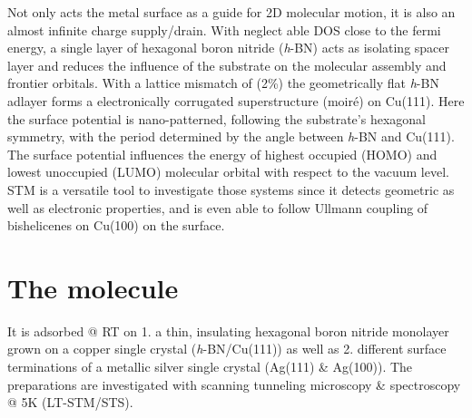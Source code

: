Not only acts the metal surface as a guide for 2D molecular motion, it is also an almost infinite charge supply/drain. With neglect able DOS close to the fermi energy, a single layer of hexagonal boron nitride (\textit{h}-BN) acts as isolating spacer layer and reduces the influence of the substrate on the molecular assembly and frontier orbitals.\cite{urgel_controlling_2015, Sushobhan_Control_2014, Schulz_Templated_2013} With a lattice mismatch of (2\%)\cite{joshi_boron_2012, preobrajenski_monolayer_2005} the geometrically flat\cite{schwarz_corrugation_2017} \textit{h}-BN adlayer forms a electronically corrugated superstructure (moir\'e) on Cu(111).\cite{joshi_boron_2012} Here the surface potential is nano-patterned\cite{joshi_boron_2012}, following the substrate’s hexagonal symmetry, with the period determined by the angle between \textit{h}-BN and Cu(111)\cite{hermann_periodic_2012}. The surface potential influences the energy of highest occupied (HOMO) and lowest unoccupied (LUMO) molecular orbital with respect to the vacuum level.\cite{Sushobhan_Control_2014, Fernandez_Spectroscopy_2008} STM is a versatile tool to investigate those systems since it detects geometric as well as electronic properties, and is even able to follow Ullmann coupling of bishelicenes on Cu(100)\cite{Waeckerlin_Surface-assisted_2016} on the surface. 

\section{The molecule}

It is adsorbed @ RT on 1. a thin, insulating hexagonal boron nitride monolayer grown on a copper single crystal (\textit{h}-BN/Cu(111)) as well as 2. different surface terminations of a metallic silver single crystal (Ag(111) \& Ag(100)). The preparations are investigated with scanning tunneling microscopy \& spectroscopy @ 5K (LT-STM/STS).

